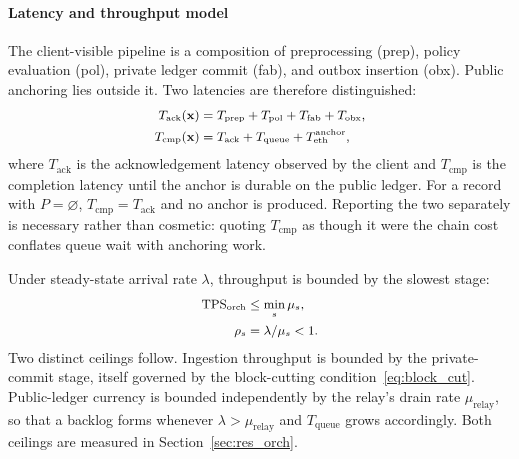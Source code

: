 \documentclass[final,5p,times,twocolumn]{elsarticle}
\begin{document}
\paragraph*{\textbf{Latency and throughput model}}
The client-visible pipeline is a composition of preprocessing (\textsf{prep}), policy evaluation (\textsf{pol}), private ledger commit (\textsf{fab}), and outbox insertion (\textsf{obx}). Public anchoring lies outside it. Two latencies are therefore distinguished:
\begin{subequations}
\small
\begin{align}
  T_{\mathrm{ack}}(\mathbf{x})
    &= T_{\mathrm{prep}}+T_{\mathrm{pol}}+T_{\mathrm{fab}}+T_{\mathrm{obx}},
    \label{eq:t_ack}\\
  T_{\mathrm{cmp}}(\mathbf{x})
    &= T_{\mathrm{ack}}+T_{\mathrm{queue}}+T_{\mathrm{eth}}^{\mathrm{anchor}},
    \label{eq:t_cmp}
\end{align}
\end{subequations}
where $T_{\mathrm{ack}}$ is the acknowledgement latency observed by the client and $T_{\mathrm{cmp}}$ is the completion latency until the anchor is durable on the public ledger. For a record with $P=\varnothing$, $T_{\mathrm{cmp}}=T_{\mathrm{ack}}$ and no anchor is produced. Reporting the two separately is necessary rather than cosmetic: quoting $T_{\mathrm{cmp}}$ as though it were the chain cost conflates queue wait with anchoring work.

Under steady-state arrival rate $\lambda$, throughput is bounded by the slowest stage:
\begin{subequations}
\small
\begin{align}
  \mathrm{TPS}_{\mathrm{orch}} &\le \min_s \mu_s, \label{eq:tps_orch}\\
  \rho_s &= \lambda/\mu_s < 1. \label{eq:util}
\end{align}
\end{subequations}
Two distinct ceilings follow. Ingestion throughput is bounded by the private-commit stage, itself governed by the block-cutting condition~\eqref{eq:block_cut}. Public-ledger currency is bounded independently by the relay's drain rate $\mu_{\mathrm{relay}}$, so that a backlog forms whenever $\lambda > \mu_{\mathrm{relay}}$ and $T_{\mathrm{queue}}$ grows accordingly. Both ceilings are measured in Section~\ref{sec:res_orch}.
\end{document}
